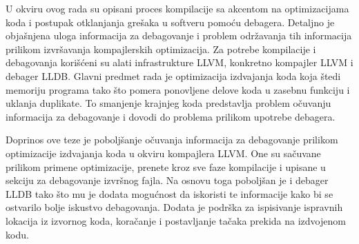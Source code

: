 \documentclass[12pt,oneside]{memoir}
\begin{document}
U okviru ovog rada su opisani proces kompilacije sa akcentom na optimizacijama koda i postupak otklanjanja grešaka u softveru pomoću debagera.
Detaljno je objašnjena uloga informacija za debagovanje i problem održavanja tih informacija prilikom izvršavanja kompajlerskih optimizacija.
Za potrebe kompilacije i debagovanja korišćeni su alati infrastrukture LLVM, konkretno kompajler LLVM i debager LLDB.
Glavni predmet rada je optimizacija izdvajanja koda koja štedi memoriju programa tako što pomera ponovljene delove koda u zasebnu funkciju i uklanja duplikate.
To smanjenje krajnjeg koda predstavlja problem očuvanju informacija za debagovanje i dovodi do problema prilikom upotrebe debagera.

Doprinos ove teze je poboljšanje očuvanja informacija za debagovanje prilikom optimizacije izdvajanja koda u okviru kompajlera LLVM.
One su sačuvane prilikom primene optimizacije, prenete kroz sve faze kompilacije i upisane u sekciju za debagovanje izvršnog fajla.
Na osnovu toga poboljšan je i debager LLDB tako što mu je dodata mogućnost da iskoristi te informacije kako bi se ostvarilo bolje iskustvo debagovanja.
Dodata je podrška za ispisivanje ispravnih lokacija iz izvornog koda, koračanje i postavljanje tačaka prekida na izdvojenom kodu.

\end{document}

